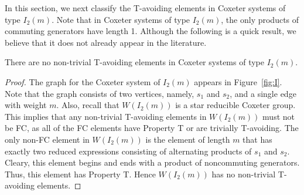 In this section, we next classify the T-avoiding elements in Coxeter systems of type $I_2(m)$. Note that in Coxeter systems of type $I_2(m)$, the only products of commuting generators have length 1. Although the following is a quick result, we believe that it does not already appear in the literature.
\begin{theorem}
There are no non-trivial T-avoiding elements in Coxeter systems of type $I_2(m)$.
\begin{proof}
	The graph for the Coxeter system of $I_2(m)$ appears in Figure~\ref{fig:I}. Note that the graph consists of two vertices, namely, $s_1$ and $s_2$, and a single edge with weight $m$. Also, recall that $W(I_2(m))$ is a star reducible Coxeter group. This implies that any non-trivial T-avoiding elements in $W(I_2(m))$ must not be FC, as all of the FC elements have Property T or are trivially T-avoiding. The only non-FC element in $W(I_2(m))$ is the element of length $m$ that has exactly two reduced expressions consisting of alternating products of $s_1$ and $s_2$. Cleary, this element begins and ends with a product of noncommuting generators. Thus, this element has Property T. Hence $W(I_2(m))$ has no non-trivial T-avoiding elements. 
\end{proof}	
\end{theorem}
 



